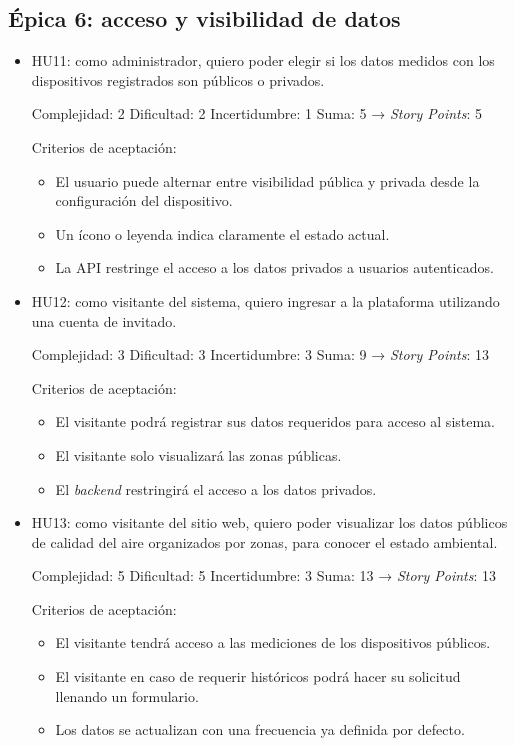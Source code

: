 \documentclass[
11pt, %
]{charter}
\begin{document}
\subsection*{Épica 6: acceso y visibilidad de datos}
\begin{itemize}
	\item HU11: como administrador, quiero poder elegir si los datos medidos con los dispositivos registrados son públicos o privados.

	Complejidad: 2
	Dificultad: 2
	Incertidumbre: 1
	Suma: 5 → \textit{Story Points}: 5

	Criterios de aceptación:
	\begin{itemize}
		\item El usuario puede alternar entre visibilidad pública y privada desde la configuración del dispositivo.
		\item Un ícono o leyenda indica claramente el estado actual.
		\item La API restringe el acceso a los datos privados a usuarios autenticados.

	\end{itemize}
	\item HU12: como visitante del sistema, quiero ingresar a la plataforma utilizando una cuenta de invitado.

	Complejidad: 3
	Dificultad: 3
	Incertidumbre: 3
	Suma: 9 → \textit{Story Points}: 13

	Criterios de aceptación:
	\begin{itemize}
		\item El visitante podrá registrar sus datos requeridos para acceso al sistema.
		\item El visitante solo visualizará las zonas públicas.
		\item El \textit{backend} restringirá el acceso a los datos privados.
	\end{itemize}

	\item HU13: como visitante del sitio web, quiero poder visualizar los datos públicos de calidad del aire organizados por zonas, para conocer el estado ambiental.

	Complejidad: 5
	Dificultad: 5
	Incertidumbre: 3
	Suma: 13 → \textit{Story Points}: 13

	Criterios de aceptación:
	\begin{itemize}
		\item El visitante tendrá acceso a las mediciones de los dispositivos públicos.
		\item El visitante en caso de requerir históricos podrá hacer su solicitud llenando un formulario.
		\item Los datos se actualizan con una frecuencia ya definida por defecto.
	\end{itemize}

\end{itemize}
\end{document}
